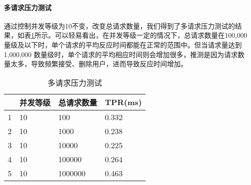 \paragraph*{多请求压力测试} 通过控制并发等级为10不变，改变总请求数量，我们得到了多请求压力测试的结果，如表\ref{tab:multiple}所示。可以轻易看出，在并发等级一定的情况下，总请求数量在100,000量级及以下时，单个请求的平均反应时间都能在正常的范围中。但当请求量达到1,000,000 数量级时，单个请求的平均相应时间则会增加很多，推测是因为请求数量太多，导致频繁接受、删除用户，进而导致反应时间增加。

\begin{table}[htbp!]
    \centering
    \begin{tabular}{llll}\hline
      & 并发等级 & 总请求数量 & TPR(ms)   \\\hline
    1 & 10      & 100       & 0.332 \\
    2 & 10      & 1000      & 0.238 \\
    3 & 10      & 10000     & 0.225\\
    4 & 10      & 100000    & 0.264\\
    5 & 10      & 1000000   & 0.463\\
    \hline
    \end{tabular}
    \caption{多请求压力测试}\label{tab:multiple}
\end{table}
